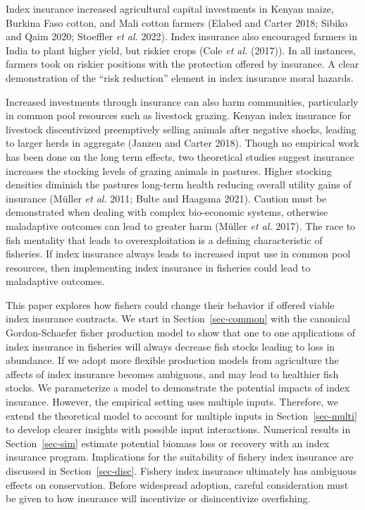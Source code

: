 \documentclass[
  letterpaper,
  DIV=11,
  numbers=noendperiod]{scrartcl}
\theoremstyle{plain}
\theoremstyle{plain}
\theoremstyle{remark}
\begin{document}
Index insurance increased agricultural capital investments in Kenyan
maize, Burkina Faso cotton, and Mali cotton farmers (Elabed and Carter
2018; Sibiko and Qaim 2020; Stoeffler \emph{et al.} 2022). Index
insurance also encouraged farmers in India to plant higher yield, but
riskier crops (Cole \emph{et al.} (2017)). In all instances, farmers
took on riskier positions with the protection offered by insurance. A
clear demonstration of the ``risk reduction'' element in index insurance
moral hazards.

Increased investments through insurance can also harm communities,
particularly in common pool resources such as livestock grazing. Kenyan
index insurance for livestock discentivized preemptively selling animals
after negative shocks, leading to larger herds in aggregate (Janzen and
Carter 2018). Though no empirical work has been done on the long term
effects, two theoretical studies suggest insurance increases the
stocking levels of grazing animals in pastures. Higher stocking
densities diminish the pastures long-term health reducing overall
utility gains of insurance (Müller \emph{et al.} 2011; Bulte and Haagsma
2021). Caution must be demonstrated when dealing with complex
bio-economic systems, otherwise maladaptive outcomes can lead to greater
harm (Müller \emph{et al.} 2017). The race to fish mentality that leads
to overexploitation is a defining characteristic of fisheries. If index
insurance always leads to increased input use in common pool resources,
then implementing index insurance in fisheries could lead to maladaptive
outcomes.

This paper explores how fishers could change their behavior if offered
viable index insurance contracts. We start in Section~\ref{sec-common}
with the canonical Gordon-Schaefer fisher production model to show that
one to one applications of index insurance in fisheries will always
decrease fish stocks leading to loss in abundance. If we adopt more
flexible production models from agriculture the affects of index
insurance becomes ambiguous, and may lead to healthier fish stocks. We
parameterize a model to demonstrate the potential impacts of index
insurance. However, the empirical setting uses multiple inputs.
Therefore, we extend the theoretical model to account for multiple
inputs in Section~\ref{sec-multi} to develop clearer insights with
possible input interactions. Numerical results in Section~\ref{sec-sim}
estimate potential biomass loss or recovery with an index insurance
program. Implications for the suitability of fishery index insurance are
discussed in Section~\ref{sec-disc}. Fishery index insurance ultimately
has ambiguous effects on conservation. Before widespread adoption,
careful consideration must be given to how insurance will incentivize or
disincentivize overfishing.
\end{document}
